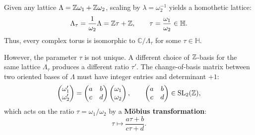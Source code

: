 \documentclass[a4paper]{article}
\begin{document}
Given any lattice $\Lambda = \mathbb{Z}\omega_1 + \mathbb{Z}\omega_2$, scaling by $\lambda = \omega_2^{-1}$ yields a homothetic lattice:
\begin{equation}
 \Lambda_\tau = \frac{1}{\omega_2} \Lambda = \mathbb{Z}\tau + \mathbb{Z}, \qquad \tau = \frac{\omega_1}{\omega_2} \in \mathbb{H}.
\end{equation}
Thus, every complex torus is isomorphic to $\mathbb{C}/\Lambda_\tau$ for some $\tau \in \mathbb{H}$.

However, the parameter $\tau$ is not unique. A different choice of $\mathbb{Z}$-basis for the same lattice $\Lambda_\tau$ produces a different ratio $\tau'$. The change-of-basis matrix between two oriented bases of $\Lambda$ must have integer entries and determinant $+1$:
\begin{equation}
 \begin{pmatrix} \omega_1' \\ \omega_2' \end{pmatrix} = \begin{pmatrix} a & b \\ c & d \end{pmatrix} \begin{pmatrix} \omega_1 \\ \omega_2 \end{pmatrix}, \qquad \begin{pmatrix} a & b \\ c & d \end{pmatrix} \in \mathrm{SL}_2(\mathbb{Z}),
\end{equation}
which acts on the ratio $\tau = \omega_1/\omega_2$ by a \textbf{Möbius transformation}:
\begin{equation}
 \tau \mapsto \frac{a\tau + b}{c\tau + d}.
\end{equation}
\end{document}
